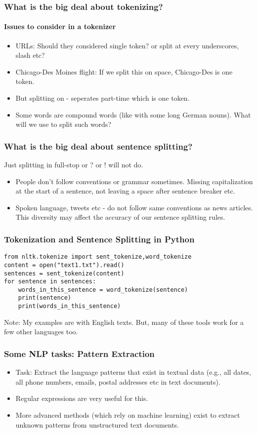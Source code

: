 \documentclass{beamer}
\begin{document}
\begin{frame}
\frametitle{What is the big deal about tokenizing?}
\framesubtitle{Issues to consider in a tokenizer}
\begin{itemize}
\item URLs: Should they considered single token? or split at every underscores, slash etc?
\item Chicago-Des Moines flight: If we split this on space, Chicago-Des is one token.
\item But splitting on - seperates part-time which is one token.
\item Some words are compound words (like with some long German nouns). What will we use to split such words? 
\end{itemize}
\end{frame}

\begin{frame}
\frametitle{What is the big deal about sentence splitting?}
Just splitting in full-stop or ? or ! will not do.
\begin{itemize}
\item People don't follow conventions or grammar sometimes. Missing capitalization at the start of a sentence, not leaving a space after sentence breaker etc.
\item Spoken language, tweets etc - do not follow same conventions as news articles. This diversity may affect the accuracy of our sentence splitting rules.
\end{itemize}
\end{frame}


\begin{frame}[fragile]
\frametitle{Tokenization and Sentence Splitting in Python}
\small
\begin{verbatim}
from nltk.tokenize import sent_tokenize,word_tokenize
content = open("text1.txt").read()
sentences = sent_tokenize(content)
for sentence in sentences:
    words_in_this_sentence = word_tokenize(sentence)
    print(sentence)
    print(words_in_this_sentence)
\end{verbatim}
Note: My examples are with English texts. But, many of these tools work for a few other languages too. 
\end{frame}

\begin{frame}
\frametitle{Some NLP tasks: Pattern Extraction}
\begin{itemize}
\item Task: Extract the language patterns that exist in textual data (e.g., all dates, all phone numbers, emails, postal addresses etc in text documents). 
\item Regular expressions are very useful for this.
\item More advanced methods (which rely on machine learning) exist to extract unknown patterns from unstructured text documents.
\end{itemize}
\end{frame}
\end{document}
